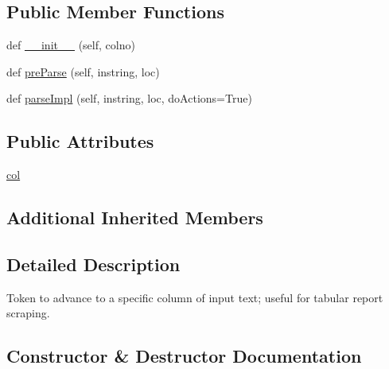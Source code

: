 \subsection*{Public Member Functions}
\begin{DoxyCompactItemize}
\item 
def \hyperlink{classpyparsing_1_1GoToColumn_a601a906545b70a0aac980f281b44422f}{\+\_\+\+\_\+init\+\_\+\+\_\+} (self, colno)
\item 
def \hyperlink{classpyparsing_1_1GoToColumn_ae2a997b3c6a1ea5684b5fa85f7b6ce9c}{pre\+Parse} (self, instring, loc)
\item 
def \hyperlink{classpyparsing_1_1GoToColumn_a77805cb3bb515764d6baba635fbbfabf}{parse\+Impl} (self, instring, loc, do\+Actions=True)
\end{DoxyCompactItemize}
\subsection*{Public Attributes}
\begin{DoxyCompactItemize}
\item 
\hyperlink{classpyparsing_1_1GoToColumn_ae61e2557b0c5b07b4ba69928494bfd7c}{col}
\end{DoxyCompactItemize}
\subsection*{Additional Inherited Members}


\subsection{Detailed Description}
\begin{DoxyVerb}Token to advance to a specific column of input text; useful for
tabular report scraping.
\end{DoxyVerb}
 

\subsection{Constructor \& Destructor Documentation}
\mbox{\label{classpyparsing_1_1GoToColumn_a601a906545b70a0aac980f281b44422f}} 
